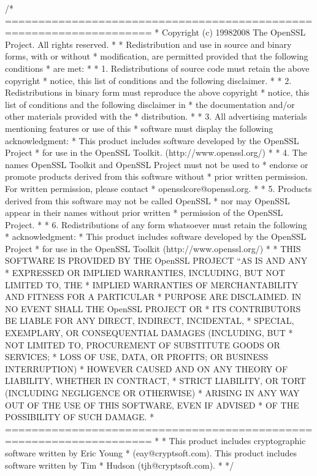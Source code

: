 \documentclass[a4,10pt,spanish]{sphinxmanual}
\begin{document}
\begin{sphinxVerbatim}[commandchars=\\\{\}]
   /* ====================================================================
    * Copyright (c) 1998\PYGZhy{}2008 The OpenSSL Project.  All rights reserved.
    *
    * Redistribution and use in source and binary forms, with or without
    * modification, are permitted provided that the following conditions
    * are met:
    *
    * 1. Redistributions of source code must retain the above copyright
    *    notice, this list of conditions and the following disclaimer.
    *
    * 2. Redistributions in binary form must reproduce the above copyright
    *    notice, this list of conditions and the following disclaimer in
    *    the documentation and/or other materials provided with the
    *    distribution.
    *
    * 3. All advertising materials mentioning features or use of this
    *    software must display the following acknowledgment:
    *    \PYGZdq{}This product includes software developed by the OpenSSL Project
    *    for use in the OpenSSL Toolkit. (http://www.openssl.org/)\PYGZdq{}
    *
    * 4. The names \PYGZdq{}OpenSSL Toolkit\PYGZdq{} and \PYGZdq{}OpenSSL Project\PYGZdq{} must not be used to
    *    endorse or promote products derived from this software without
    *    prior written permission. For written permission, please contact
    *    openssl\PYGZhy{}core@openssl.org.
    *
    * 5. Products derived from this software may not be called \PYGZdq{}OpenSSL\PYGZdq{}
    *    nor may \PYGZdq{}OpenSSL\PYGZdq{} appear in their names without prior written
    *    permission of the OpenSSL Project.
    *
    * 6. Redistributions of any form whatsoever must retain the following
    *    acknowledgment:
    *    \PYGZdq{}This product includes software developed by the OpenSSL Project
    *    for use in the OpenSSL Toolkit (http://www.openssl.org/)\PYGZdq{}
    *
    * THIS SOFTWARE IS PROVIDED BY THE OpenSSL PROJECT ``AS IS\PYGZsq{}\PYGZsq{} AND ANY
    * EXPRESSED OR IMPLIED WARRANTIES, INCLUDING, BUT NOT LIMITED TO, THE
    * IMPLIED WARRANTIES OF MERCHANTABILITY AND FITNESS FOR A PARTICULAR
    * PURPOSE ARE DISCLAIMED.  IN NO EVENT SHALL THE OpenSSL PROJECT OR
    * ITS CONTRIBUTORS BE LIABLE FOR ANY DIRECT, INDIRECT, INCIDENTAL,
    * SPECIAL, EXEMPLARY, OR CONSEQUENTIAL DAMAGES (INCLUDING, BUT
    * NOT LIMITED TO, PROCUREMENT OF SUBSTITUTE GOODS OR SERVICES;
    * LOSS OF USE, DATA, OR PROFITS; OR BUSINESS INTERRUPTION)
    * HOWEVER CAUSED AND ON ANY THEORY OF LIABILITY, WHETHER IN CONTRACT,
    * STRICT LIABILITY, OR TORT (INCLUDING NEGLIGENCE OR OTHERWISE)
    * ARISING IN ANY WAY OUT OF THE USE OF THIS SOFTWARE, EVEN IF ADVISED
    * OF THE POSSIBILITY OF SUCH DAMAGE.
    * ====================================================================
    *
    * This product includes cryptographic software written by Eric Young
    * (eay@cryptsoft.com).  This product includes software written by Tim
    * Hudson (tjh@cryptsoft.com).
    *
    */


\end{sphinxVerbatim}
\end{document}
